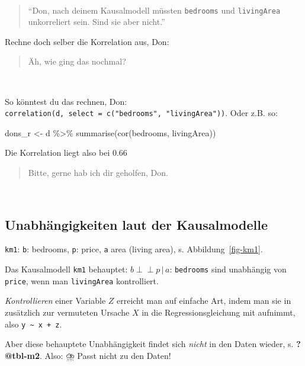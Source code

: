 \documentclass[
  a4paper,
  DIV=11]{scrreprt}
\newenvironment{Shaded}{\begin{snugshade}}{\end{snugshade}}
\newcommand{\FunctionTok}[1]{\textcolor[rgb]{0.28,0.35,0.67}{#1}}
\newcommand{\NormalTok}[1]{\textcolor[rgb]{0.00,0.23,0.31}{#1}}
\newcommand{\OtherTok}[1]{\textcolor[rgb]{0.00,0.23,0.31}{#1}}
\newcommand{\SpecialCharTok}[1]{\textcolor[rgb]{0.37,0.37,0.37}{#1}}
\theoremstyle{definition}
\theoremstyle{remark}
\begin{document}
🧑

\begin{quote}
``Don, nach deinem Kausalmodell müssten \texttt{bedrooms} und
\texttt{livingArea} unkorreliert sein. Sind sie aber nicht.''
\end{quote}

Rechne doch selber die Korrelation aus, Don:

\begin{quote}
Äh, wie ging das nochmal?
\end{quote}

🧑

So könntest du das rechnen, Don:
\texttt{correlation(d,\ select\ =\ c("bedrooms",\ "livingArea"))}. Oder
z.B. so:

\begin{Shaded}
\begin{Highlighting}[]
\NormalTok{dons\_r }\OtherTok{\textless{}{-}}\NormalTok{ d }\SpecialCharTok{\%\textgreater{}\%} 
  \FunctionTok{summarise}\NormalTok{(}\FunctionTok{cor}\NormalTok{(bedrooms, livingArea))}
\end{Highlighting}
\end{Shaded}

Die Korrelation liegt also bei 0.66

\begin{quote}
Bitte, gerne hab ich dir geholfen, Don.
\end{quote}

👩

\hypertarget{unabhuxe4ngigkeiten-laut-der-kausalmodelle}{%
\subsection{Unabhängigkeiten laut der
Kausalmodelle}\label{unabhuxe4ngigkeiten-laut-der-kausalmodelle}}

\texttt{km1}: \texttt{b}: bedrooms, \texttt{p}: price, \texttt{a} area
(living area), s. Abbildung~\ref{fig-km1}.

Das Kausalmodell \texttt{km1} behauptet:
\(b \perp \!\!\! \perp p \, |\, a\): \texttt{bedrooms} sind unabhängig
von \texttt{price}, wenn man \texttt{livingArea} kontrolliert.

\emph{Kontrollieren} einer Variable \(Z\) erreicht man auf einfache Art,
indem man sie in zusätzlich zur vermuteten Ursache \(X\) in die
Regressionsgleichung mit aufnimmt, also
\texttt{y\ \textasciitilde{}\ x\ +\ z}.

Aber diese behauptete Unabhängigkeit findet sich \emph{nicht} in den
Daten wieder, s. \textbf{?@tbl-m2}. Also: ⛈️ Passt nicht zu den Daten!
\end{document}
